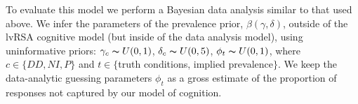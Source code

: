 \documentclass[10pt,letterpaper]{article}
\begin{document}
To evaluate this model we perform a Bayesian data analysis similar to that used above.
We infer the parameters of the prevalence prior, $\beta(\gamma,\delta)$, outside of the lvRSA cognitive model (but inside of the data analysis model), using uninformative priors:
$\gamma_{c} \thicksim U(0,1)$,  $\delta_{c} \thicksim U(0,5)$, $\phi_{t} \thicksim U(0,1)$,
where $c \in \{DD,NI,P\}$ and $t \in \{$truth conditions, implied prevalence$\}$.
We keep the data-analytic guessing parameters $\phi_{t}$ as a gross estimate of the proportion of responses not captured by our model of cognition. 
\end{document}
